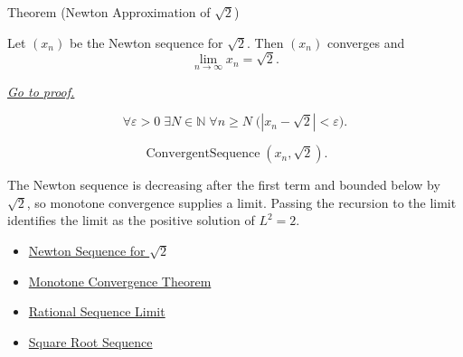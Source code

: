 
\begin{theorembox}{Theorem (Newton Approximation of $\sqrt{2}$)}
\begin{theorem}
\label{thm:newton-approximation-sqrt-two}
Let $(x_n)$ be the Newton sequence for $\sqrt{2}$. Then $(x_n)$ converges
and
\[
  \lim_{n\to\infty}x_n=\sqrt{2}.
\]

\smallskip
\noindent
\hyperref[prf:newton-approximation-sqrt-two]{\textit{Go to proof.}}
\end{theorem}
\end{theorembox}

\begin{remark*}
\[
\forall \varepsilon>0\;\exists N\in\mathbb{N}\;\forall n\ge N
\;\bigl(|x_n-\sqrt{2}|<\varepsilon\bigr).
\]
\end{remark*}

\begin{remark*}
\[
\operatorname{ConvergentSequence}(x_n,\sqrt{2}).
\]
\end{remark*}

\begin{remark*}[Interpretation]
The Newton sequence is decreasing after the first term and bounded below by
$\sqrt{2}$, so monotone convergence supplies a limit. Passing the recursion
to the limit identifies the limit as the positive solution of $L^2=2$.
\end{remark*}

\begin{dependencies}
\begin{itemize}
  \item \hyperref[def:newton-sequence-sqrt-two]{Newton Sequence for $\sqrt{2}$}
  \item \hyperref[thm:monotone-convergence-theorem]{Monotone Convergence Theorem}
  \item \hyperref[thm:rational-sequence-limit]{Rational Sequence Limit}
  \item \hyperref[def:square-root-sequence]{Square Root Sequence}
\end{itemize}
\end{dependencies}


